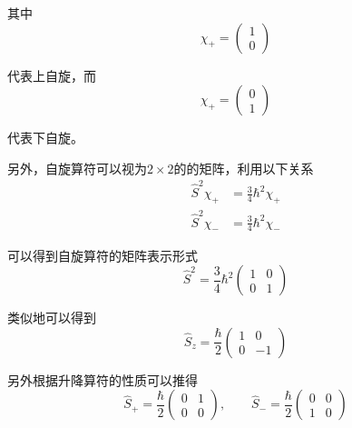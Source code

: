 \documentclass[UTF8]{ctexart}
\begin{document}
\noindent 其中 
\begin{equation}
    \chi_{+} = \left(\begin{array}{c}
        {1} \\ {0}
    \end{array}\right)
\end{equation}

\noindent 代表上自旋，而
\begin{equation}
    \chi_{+} = \left(\begin{array}{c}
        {0} \\ {1}
    \end{array}\right)
\end{equation}

\noindent 代表下自旋。

    另外，自旋算符可以视为$2 \times 2$的的矩阵，利用以下关系
    \begin{equation}
        \begin{aligned}
            \hat{S}^2 \chi_{+} &= \frac{3}{4} \hbar^2 \chi_{+} \\
            \hat{S}^2 \chi_{-} &= \frac{3}{4} \hbar^2 \chi_{-}
        \end{aligned}
    \end{equation}

\noindent 可以得到自旋算符的矩阵表示形式
\begin{equation}
    \hat{S}^2 = \frac{3}{4} \hbar^2 \left(\begin{array}{cc}
        {1} & {0} \\
        {0} & {1}
    \end{array}\right)
\end{equation}

    类似地可以得到
    \begin{equation}
        \hat{S}_z = \frac{\hbar}{2} \left(\begin{array}{cc}
            {1} & {0} \\
            {0} & {-1}
        \end{array}\right)
    \end{equation}

\noindent 另外根据升降算符的性质可以推得
\begin{equation}
    \hat{S}_+ = \frac{\hbar}{2} \left(\begin{array}{cc}
        {0} & {1} \\
        {0} & {0}
    \end{array}\right)
    , \qquad 
    \hat{S}_- = \frac{\hbar}{2} \left(\begin{array}{cc}
        {0} & {0} \\
        {1} & {0}
    \end{array}\right)
\end{equation}
\end{document}
